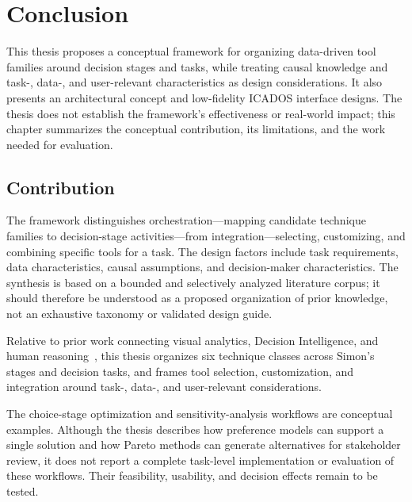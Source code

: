 \documentclass{sfuthesis}
\begin{document}
\chapter{Conclusion}
This thesis proposes a conceptual framework for organizing data-driven tool families around decision stages and tasks, while treating causal knowledge and task-, data-, and user-relevant characteristics as design considerations. It also presents an architectural concept and low-fidelity ICADOS interface designs. The thesis does not establish the framework's effectiveness or real-world impact; this chapter summarizes the conceptual contribution, its limitations, and the work needed for evaluation.
\section{Contribution}
The framework distinguishes orchestration—mapping candidate technique families to decision-stage activities—from integration—selecting, customizing, and combining specific tools for a task. The design factors include task requirements, data characteristics, causal assumptions, and decision-maker characteristics. The synthesis is based on a bounded and selectively analyzed literature corpus; it should therefore be understood as a proposed organization of prior knowledge, not an exhaustive taxonomy or validated design guide.

Relative to prior work connecting visual analytics, Decision Intelligence, and human reasoning~\cite{zaimoglu2023epistemological,pratt_bringing_2023}, this thesis organizes six technique classes across Simon's stages and decision tasks, and frames tool selection, customization, and integration around task-, data-, and user-relevant considerations.

The choice-stage optimization and sensitivity-analysis workflows are conceptual examples. Although the thesis describes how preference models can support a single solution and how Pareto methods can generate alternatives for stakeholder review, it does not report a complete task-level implementation or evaluation of these workflows. Their feasibility, usability, and decision effects remain to be tested.
\end{document}
